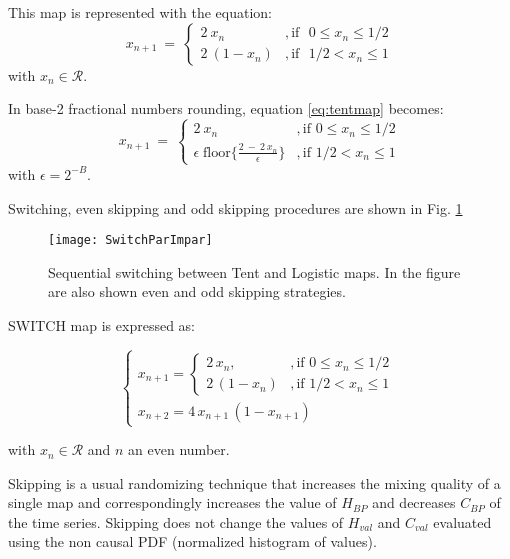 This map is represented with the equation:
\begin{equation}\label{eq:tentmap}
x_{n+1}~=~ \left\{ \begin{array}{ll}
2~{x_n} &, \textrm{if ~$0\leq x_n\leq 1/2$}\\
2~(1-{x_n}) &, \textrm{if ~$1/2<x_n\leq 1$} 
\end{array} \right.  
\end{equation}
with $x_n\in\mathcal{R}$.

In base-2 fractional numbers rounding, equation \ref{eq:tentmap} becomes:
\begin{equation}\label{eq:tentdecbin}
x_{n+1}~=~ \left\{ \begin{array}{ll}
2~{x_n} &, \textrm{if $0\leq x_n\leq 1/2$}\\
\epsilon \; \text{floor}\{\frac{2~-~2~x_n}{\epsilon}\} &, \textrm{if $1/2<x_n\leq 1$} 
\end{array} \right.  
\end{equation}
with $\epsilon=2^{-B}$.

Switching, even skipping and odd skipping procedures are shown in Fig. \ref{fig:seq}

\begin{figure}
\centering	
	\texttt{[image: SwitchParImpar]}
	\caption{Sequential switching between Tent and Logistic maps. In the figure are also shown even and odd skipping strategies.} \label{fig:seq}
\end{figure}

SWITCH map is expressed as:

\begin{equation}
\begin{cases}
x_{n+1}=
\begin{cases}
2\,x_n, &, \mbox{if } 0\leq x_n\leq 1/2 \\
2\,(1-x_n ) &, \mbox{if } 1/2<x_n\leq 1
\end{cases} \\
x_{n+2}=4\,x_{n+1}\,(1-x_{n+1})
\end{cases}\label{eq:SWITCH}
\end{equation}

\noindent with $x_n\in\mathcal{R}$ and $n$ an even number.

Skipping is a usual randomizing technique that increases the mixing quality of a single map and correspondingly increases the value of $H_{BP}$ and decreases $C_{BP} $ of the time series.
Skipping does not change the values of $H_{val}$ and $C_{val}$ evaluated using the non causal PDF (normalized histogram of values)\cite{DeMicco2008}.

